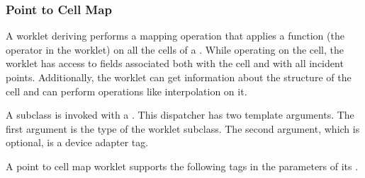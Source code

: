 \subsubsection{Point to Cell Map}
\label{sec:WorkletMapPointToCell}


A worklet deriving  performs a mapping
operation that applies a function (the operator in the worklet) on all the
cells of a . While operating on the cell, the
worklet has access to fields associated both with the cell and with all
incident points. Additionally, the worklet can get information about the
structure of the cell and can perform operations like interpolation on it.

A  subclass is invoked with a
. This dispatcher has two template
arguments. The first argument is the type of the worklet subclass. The
second argument, which is optional, is a device adapter tag.

A point to cell map worklet supports the following tags in the parameters
of its \controlsignature.

